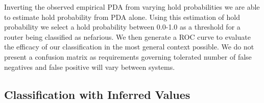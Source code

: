   Inverting the observed empirical PDA from varying hold probabilities we are able to estimate hold probability from PDA alone. Using this estimation of hold probability we select a hold probability between 0.0-1.0 as a threshold for a router being classified as nefarious. We then generate a ROC curve to evaluate the efficacy of our classification in the most general context possible. We do not present a confusion matrix  as requirements governing tolerated number of false negatives and false positive will vary between systems.\par
 
  
  \subsection{Classification with Inferred Values}
  \label{ssec:MInferredvalues}
  
